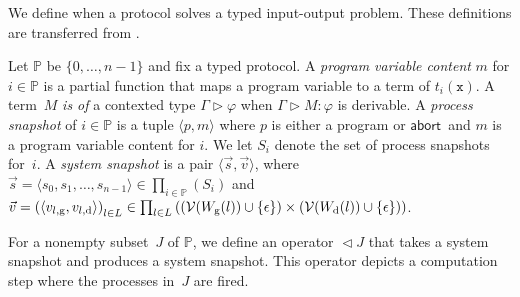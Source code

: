 \documentclass[doctor]{iscs-thesis}
\newcommand{\tuple}[1]{\langle{#1}\rangle}
\newcommand{\tr}{\vartriangleright}
\newcommand{\update}{\vartriangleleft}
\newcommand{\processes}{\mathbb{P}}
\newcommand{\p}[1]{\texttt{#1}}
\newcommand{\vg}[2]{{#1}_{#2, \mathrm g}}
\newcommand{\vd}[2]{{#1}_{#2, \mathrm d}}
\newcommand{\abort}{\mathsf{abort\,}}
\newcommand{\val}  [0]{\mathcal{V}}
\newcommand{\tj}   [2]{ {#1} \colon{#2} }
\begin{document}
We define when a protocol solves a typed
input-output problem.
These definitions are transferred from \cite{Saks:1993vq}.

Let $\processes$ be $\{0,\ldots, n-1\}$ and fix
a typed protocol.
A \textit{program variable content} $m$ for $i\in\processes$ is a
partial
function
that maps a program variable to a term of $t_i(\p x)$.
A term~$M$ \textit{is of} a contexted type $\Gamma\tr\varphi$ when
$\Gamma\tr
\tj M\varphi$ is derivable.
A \textit{process snapshot} of $i\in\processes$ is a tuple
$\tuple{p,m}$ where $p$ is either a program or $\abort$ and $m$ is a
program variable content for $i$.
We let $S_i$ denote the set of process snapshots for~$i$.
A \textit{system snapshot}
is a pair $\tuple{\vec s, \vec v}$, where $\vec s = \tuple{s_0,
{s_1,{\ldots,s_{n-1}}}} \in
\prod_{i\in \processes}\left(S_i\right)
$
and
$\vec v =
\left(\tuple{\vg{v}{l}, \vd{v}{l}}\right)_{l\in L} \in \prod_{l\in
L}\left((\val(\Wg(l))\cup\{\epsilon\})\times (\val(\Wd(l))\cup\{\epsilon\})\right)
$.

For a nonempty subset~$J$ of $\processes$, we define an operator $\update J$ that
takes a system snapshot and produces a system snapshot.
This operator depicts a computation step where the processes in~$J$
are fired.
\end{document}
